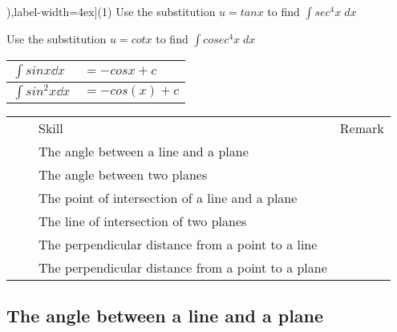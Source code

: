 





\newpage
\begin{exercise}
    \begin{tasks}[after-item-skip=2pt,after-skip=3pt, counter-format=(tsk[1]),label-width=4ex](1)
        \task  Use the substitution $u=tanx$ to find $\displaystyle \int sec^4x \;   dx $ 
                
        \task  Use the substitution $u=cotx$ to find $\displaystyle \int cosec^4x \; dx $ 
                
    \end{tasks}
\end{exercise}


\begin{table}[ht]
   \centering
   \sffamily
   \begin{tabular}{|l|l|}
     
        \hline   $\displaystyle \int sinx     \dd x $ & $=-cosx + c$ 
     \\ \hline   $\displaystyle \int sin^2x   \dd x $ & $=-cos(x) + c$
     \\ \hline
  \end{tabular}
\end{table}





\begin{center}
\begin{tabular}{|*{4}{l|}}
\hline
\rowcolor{lightgray}  &  & Skill & Remark \tabularnewline
                      &  & The angle between a line and a plane               & \tabularnewline
\hline
                      &  & The angle between two planes                       & \tabularnewline
\hline
                      &  & The point of intersection of a line and a plane    & \tabularnewline
\hline
                      &  & The line of intersection of two planes             & \tabularnewline
\hline
                      &  & The perpendicular distance from a point to a line  & \tabularnewline
\hline
                      &  & The perpendicular distance from a point to a plane & \tabularnewline
\hline
\end{tabular}
\end{center}


\subsection{The angle between a line and a plane}
